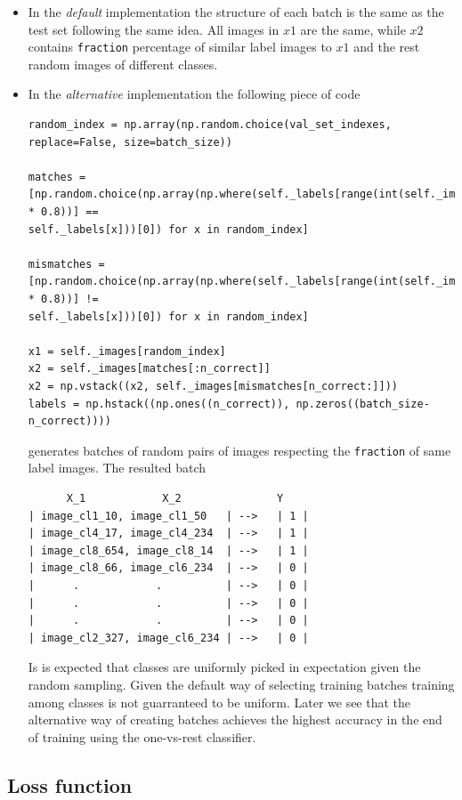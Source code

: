 \documentclass{article}
\begin{document}
\begin{itemize}
\item In the \emph{default} implementation the structure of each batch is the same as the test set following the same idea.
All images in $x1$ are the same, while $x2$ contains \texttt{fraction} percentage of similar label images to $x1$ and the rest random images of different classes.
\item In the \emph{alternative} implementation the following piece of code
\begin{tiny}
\begin{verbatim}
random_index = np.array(np.random.choice(val_set_indexes, replace=False, size=batch_size))

matches = [np.random.choice(np.array(np.where(self._labels[range(int(self._images.shape[0] * 0.8))] == 
self._labels[x]))[0]) for x in random_index]

mismatches = [np.random.choice(np.array(np.where(self._labels[range(int(self._images.shape[0] * 0.8))] != 
self._labels[x]))[0]) for x in random_index]

x1 = self._images[random_index]
x2 = self._images[matches[:n_correct]]
x2 = np.vstack((x2, self._images[mismatches[n_correct:]]))
labels = np.hstack((np.ones((n_correct)), np.zeros((batch_size-n_correct))))
\end{verbatim}
\end{tiny}
generates batches of random pairs of images respecting the \texttt{fraction} of same label images.
The resulted batch 
\begin{verbatim}
      X_1            X_2               Y
| image_cl1_10, image_cl1_50   | -->   | 1 |
| image_cl4_17, image_cl4_234  | -->   | 1 |
| image_cl8_654, image_cl8_14  | -->   | 1 |
| image_cl8_66, image_cl6_234  | -->   | 0 |
|      .            .          | -->   | 0 |
|      .            .          | -->   | 0 |
|      .            .          | -->   | 0 |
| image_cl2_327, image_cl6_234 | -->   | 0 |
\end{verbatim}
Is is expected that classes are uniformly picked in expectation given the random sampling. Given the default way of selecting training batches training among classes is not guarranteed to be uniform.
Later we see that the alternative way of creating batches achieves the highest accuracy in the end of training using the one-vs-rest classifier.
\end{itemize}


\subsection{Loss function}
\end{document}
